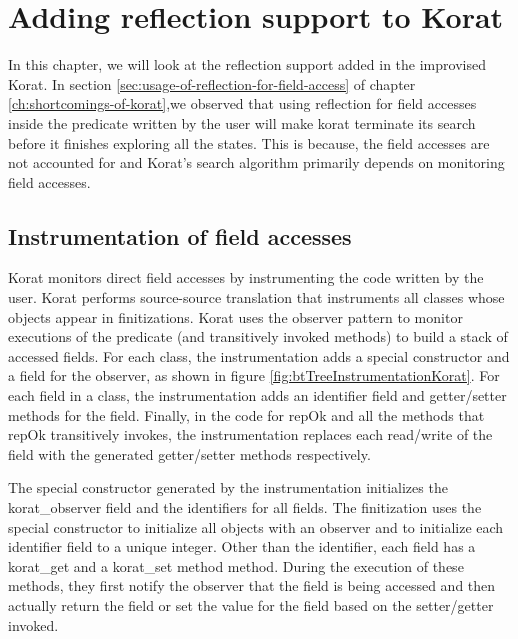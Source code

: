 \chapter{Adding reflection support to Korat}
\label{ch:adding-reflection}
In this chapter, we will look at the reflection support added in the improvised Korat. In section \ref{sec:usage-of-reflection-for-field-access} of chapter \ref{ch:shortcomings-of-korat},we observed that using reflection for field accesses inside the predicate written by the user will make korat terminate its search before it finishes exploring all the states. This is because, the field accesses are not accounted for and Korat’s search algorithm primarily depends on monitoring field accesses.

\section{Instrumentation of field accesses}
\label{sec:instrumentation-of-field-accesses}
Korat monitors direct field accesses by instrumenting the code written by the user. Korat performs source-source translation that instruments all classes whose objects appear in finitizations. Korat uses the observer pattern \cite{...} to monitor executions of the predicate (and transitively invoked methods) to build a stack of accessed fields. For each class, the instrumentation adds a special constructor and a field for the observer, as shown in figure \ref{fig:btTreeInstrumentationKorat}. For each field in a class, the instrumentation adds an identifier field and getter/setter methods for the field. Finally, in the code for repOk and all the methods that repOk transitively invokes, the instrumentation replaces each read/write of the field with the generated getter/setter methods respectively.

\para
The special constructor generated by the instrumentation initializes the korat\_observer field and the identifiers for all fields. The finitization uses the special constructor to initialize all objects with an observer and to initialize each identifier field to a unique integer. Other than the identifier, each field has a korat\_get and a korat\_set method method. During the execution of these methods, they first notify the observer that the field is being accessed and then actually return the field or set the value for the field based on the setter/getter invoked.


